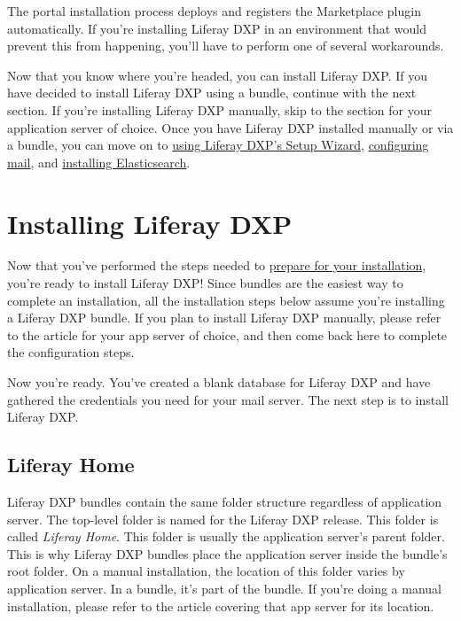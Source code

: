 The portal installation process deploys and registers the Marketplace
plugin automatically. If you're installing Liferay DXP in an environment
that would prevent this from happening, you'll have to perform one of
several workarounds.

Now that you know where you're headed, you can install Liferay DXP. If
you have decided to install Liferay DXP using a bundle, continue with
the next section. If you're installing Liferay DXP manually, skip to the
section for your application server of choice. Once you have Liferay DXP
installed manually or via a bundle, you can move on to
\href{/docs/7-1/deploy/-/knowledge_base/d/installing-liferay\#\#using-liferays-setup-wizard}{using
Liferay DXP's Setup Wizard},
\href{/docs/7-1/deploy/-/knowledge_base/d/installing-liferay\#configuring-mail}{configuring
mail}, and
\href{/docs/7-1/deploy/-/knowledge_base/d/installing-elasticsearch}{installing
Elasticsearch}.

\section{Installing Liferay DXP}\label{installing-liferay-dxp}

Now that you've performed the steps needed to
\href{/docs/7-1/deploy/-/knowledge_base/d/preparing-for-install}{prepare
for your installation}, you're ready to install Liferay DXP! Since
bundles are the easiest way to complete an installation, all the
installation steps below assume you're installing a Liferay DXP bundle.
If you plan to install Liferay DXP manually, please refer to the article
for your app server of choice, and then come back here to complete the
configuration steps.

Now you're ready. You've created a blank database for Liferay DXP and
have gathered the credentials you need for your mail server. The next
step is to install Liferay DXP.

\subsection{Liferay Home}\label{liferay-home}

Liferay DXP bundles contain the same folder structure regardless of
application server. The top-level folder is named for the Liferay DXP
release. This folder is called \emph{Liferay Home}. This folder is
usually the application server's parent folder. This is why Liferay DXP
bundles place the application server inside the bundle's root folder. On
a manual installation, the location of this folder varies by application
server. In a bundle, it's part of the bundle. If you're doing a manual
installation, please refer to the article covering that app server for
its location.

